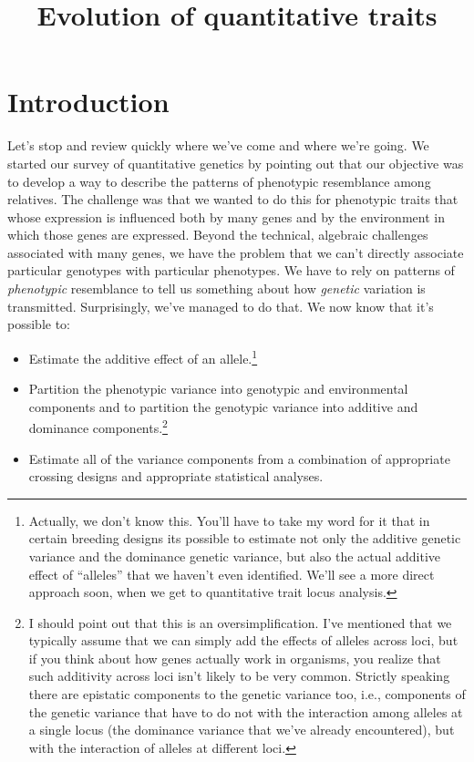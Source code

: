 \documentclass[12pt]{article}
\title{Evolution of quantitative traits}
\begin{document}
\maketitle

\thispagestyle{first}

\section*{Introduction}

Let's stop and review quickly where we've come and where we're
going. We started our survey of quantitative genetics by pointing out
that our objective was to develop a way to describe the patterns of
phenotypic resemblance among relatives. The challenge was that we
wanted to do this for phenotypic traits that whose expression is
influenced both by many genes and by the environment in which those
genes are expressed. Beyond the technical, algebraic challenges
associated with many genes, we have the problem that we can't directly
associate particular genotypes with particular phenotypes. We have to
rely on patterns of {\it phenotypic\/} resemblance to tell us
something about how {\it genetic\/} variation is
transmitted. Surprisingly, we've managed to do that. We now know that
it's possible to:

\begin{itemize}

\item Estimate the additive effect of an allele.\footnote{Actually, we
  don't know this. You'll have to take my word for it that in certain
  breeding designs its possible to estimate not only the additive
  genetic variance and the dominance genetic variance, but also the
  actual additive effect of ``alleles'' that we haven't even
  identified. We'll see a more direct approach soon, when we get to
  quantitative trait locus analysis.}

\item Partition the phenotypic variance into genotypic and
  environmental components and to partition the genotypic variance
  into additive and dominance components.\footnote{I should point out
    that this is an oversimplification. I've mentioned that we
    typically assume that we can simply add the effects of alleles
    across loci, but if you think about how genes actually work in
    organisms, you realize that such additivity across loci isn't
    likely to be very common. Strictly speaking there are epistatic
    components to the genetic variance too, i.e., components of the
    genetic variance that have to do not with the interaction among
    alleles at a single locus (the dominance variance that we've
    already encountered), but with the interaction of alleles at
    different loci.}

\item Estimate all of the variance components from a combination of
appropriate crossing designs and appropriate statistical analyses.

\end{itemize}
\end{document}
